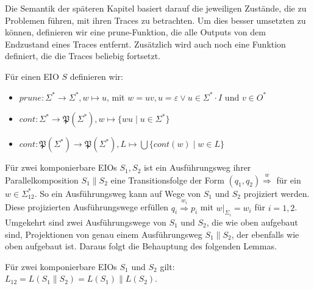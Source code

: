 Die Semantik der späteren Kapitel basiert darauf die jeweiligen Zustände, die
zu Problemen führen, mit ihren Traces zu betrachten. Um dies besser umsetzten zu
können, definieren wir eine prune-Funktion, die alle Outputs von dem Endzustand
eines Traces entfernt. Zusätzlich wird auch noch eine Funktion definiert, die
die Traces beliebig fortsetzt.

\begin{Def}
  Für einen EIO $S$ definieren wir:
  \begin{itemize}
    \item $prune:\Sigma ^*\rightarrow\Sigma ^*, w\mapsto u$, mit $w=uv,
      u=\varepsilon\vee u\in\Sigma ^*\cdot I$ und $v\in O^*$
    \item $cont:\Sigma ^*\rightarrow\mathfrak{P}(\Sigma ^*),
      w\mapsto\{wu\mid u\in\Sigma ^*\}$
    \item $cont:\mathfrak{P}(\Sigma ^*)\rightarrow\mathfrak{P}(\Sigma ^*),
      L\mapsto\bigcup\{cont(w)\mid w\in L\}$
  \end{itemize}
\end{Def}

Für zwei komponierbare EIOs $S_1, S_2$ ist ein Ausführungsweg ihrer
Parallelkomposition $S_1\| S_2$ eine Transitionsfolge der Form $(q_1,q_2)
\overset{w}{\Rightarrow}$ für ein $w\in\Sigma_{12}^*$. So ein Ausführungsweg
kann auf Wege von $S_1$ und $S_2$ projiziert werden. Diese projizierten
Ausführungswege erfüllen $q_i \overset{w_i}{\Rightarrow} p_i$ mit $w|_{\Sigma
_i}=w_i$ für $i=1,2$. Umgekehrt sind zwei Ausführungswege von $S_1$ und $S_2$,
die wie oben aufgebaut sind, Projektionen von genau einem Ausführungsweg
$S_1\|S_2$, der ebenfalls wie oben aufgebaut ist. Daraus folgt die Behauptung
des folgenden Lemmas.

\begin{lem}
  \label{LemmaSprache}
  Für zwei komponierbare EIOs $S_1$ und $S_2$ gilt: $L_{12} = L(S_1\|S_2) =
  L(S_1)\|L(S_2)$.
\end{lem}
